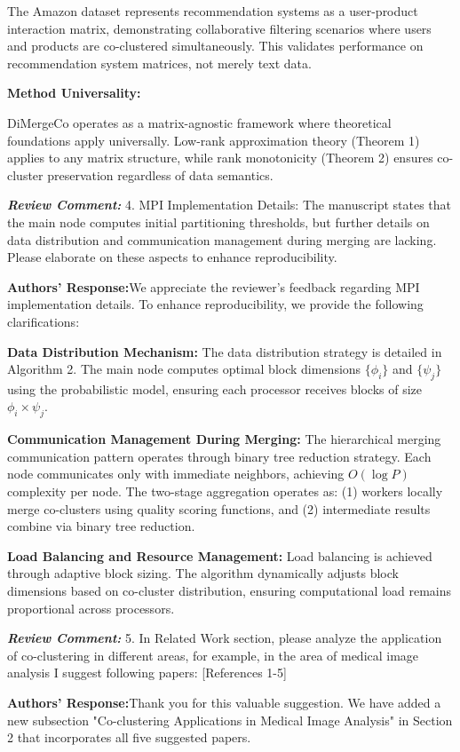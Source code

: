\documentclass{ar2rc}
\renewcommand{\RC}[1]{\textbf{\textit{Review Comment:}} #1}
\renewcommand{\AR}{\textbf{Authors' Response:}}
\begin{document}
The Amazon dataset represents recommendation systems as a user-product interaction matrix, demonstrating collaborative filtering scenarios where users and products are co-clustered simultaneously. This validates performance on recommendation system matrices, not merely text data.

\textbf{Method Universality:}

DiMergeCo operates as a matrix-agnostic framework where theoretical foundations apply universally. Low-rank approximation theory (Theorem 1) applies to any matrix structure, while rank monotonicity (Theorem 2) ensures co-cluster preservation regardless of data semantics.

\RC{4. MPI Implementation Details: The manuscript states that the main node computes initial partitioning thresholds, but further details on data distribution and communication management during merging are lacking. Please elaborate on these aspects to enhance reproducibility.}

\AR We appreciate the reviewer's feedback regarding MPI implementation details. To enhance reproducibility, we provide the following clarifications:

\textbf{Data Distribution Mechanism:}
The data distribution strategy is detailed in Algorithm 2. The main node computes optimal block dimensions $\{\phi_i\}$ and $\{\psi_j\}$ using the probabilistic model, ensuring each processor receives blocks of size $\phi_i \times \psi_j$.

\textbf{Communication Management During Merging:}
The hierarchical merging communication pattern operates through binary tree reduction strategy. Each node communicates only with immediate neighbors, achieving $O(\log P)$ complexity per node. The two-stage aggregation operates as: (1) workers locally merge co-clusters using quality scoring functions, and (2) intermediate results combine via binary tree reduction.

\textbf{Load Balancing and Resource Management:}
Load balancing is achieved through adaptive block sizing. The algorithm dynamically adjusts block dimensions based on co-cluster distribution, ensuring computational load remains proportional across processors.

\RC{5. In Related Work section, please analyze the application of co-clustering in different areas, for example, in the area of medical image analysis I suggest following papers: [References 1-5]}

\AR Thank you for this valuable suggestion. We have added a new subsection "Co-clustering Applications in Medical Image Analysis" in Section 2 that incorporates all five suggested papers.
\end{document}
